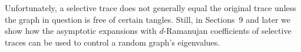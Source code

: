 \documentclass[12pt]{article}
\newcommand{\dtreelike}{{$d$-Ramanujan}}
\begin{document}
Unfortunately, a selective trace does not generally equal the original
trace unless the graph in question is free of certain tangles.
Still, in Sections~9 and later we show how the asymptotic expansions
with {\dtreelike} coefficients of
selective traces can be used to control
a random graph's eigenvalues.



\end{document}
